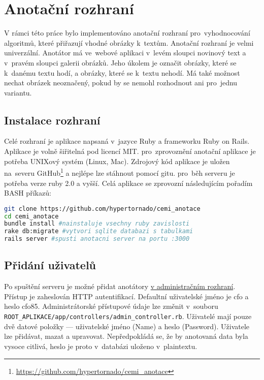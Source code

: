 \chapter{Anotační rozhraní}
\label{chap:rozhrani}

V rámci této práce bylo implementováno anotační rozhraní pro~vyhodnocování algoritmů, které přiřazují vhodné obrázky k~textům. Anotační rozhraní je velmi univerzální. Anotátor má ve~webové aplikaci v~levém sloupci novinový text a v~pravém sloupci galerii obrázků. Jeho úkolem je označit obrázky, které se k~danému textu hodí, a obrázky, které se k~textu nehodí. Má také možnost nechat obrázek neoznačený, pokud by se nemohl rozhodnout ani pro~jednu variantu.

\section{Instalace rozhraní}

Celé rozhraní je aplikace napsaná v~jazyce Ruby a frameworku Ruby on Rails. Aplikace je volně šiřitelná pod licencí MIT. pro~zprovoznění anotační aplikace je potřeba UNIXový systém (Linux, Mac). Zdrojový kód aplikace je uložen na~severu GitHub\footnote{\url{https://github.com/hypertornado/cemi_anotace}} a nejlépe lze stáhnout pomocí gitu. pro~běh serveru je potřeba verze ruby 2.0 a vyšší. Celá aplikace se zprovozní následujícím pořadím BASH příkazů:

\begin{lstlisting}[language=bash]
git clone https://github.com/hypertornado/cemi_anotace
cd cemi_anotace
bundle install #nainstaluje vsechny ruby zavislosti
rake db:migrate #vytvori sqlite databazi s tabulkami
rails server #spusti anotacni server na portu :3000
\end{lstlisting}

\section{Přidání uživatelů}

Po spuštění serveru je možné přidat anotátory \href{http://localhost:3000/users}{v administračním rozhraní}. Přístup je zaheslován HTTP autentifikací. Defaultní uživatelské jméno je cfo a heslo cfo85. Administrátorské přístupové údaje lze změnit v~souboru\\\lstinline{ROOT_APLIKACE/app/controllers/admin_controller.rb}. Uživatelé mají pouze dvě datové položky --- uživatelské jméno (Name) a heslo (Password). Uživatele lze přidávat, mazat a upravovat. Nepředpokládá se, že by anotovaná data byla vysoce citlivá, heslo je proto v~databázi uloženo v~plaintextu.


